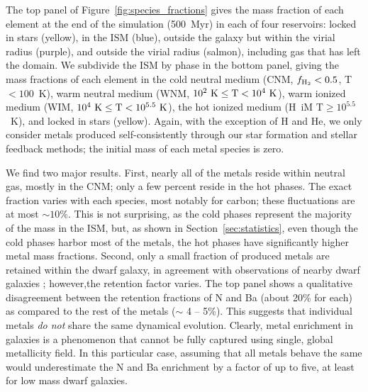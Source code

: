 \documentclass[twocolumn]{aastex61}
\begin{document}
The top panel of Figure~\ref{fig:species_fractions} gives the mass fraction of each element at the end of the simulation (500~Myr) in each of four reservoirs: locked in stars (yellow), in the ISM (blue), outside the galaxy but within the virial radius (purple), and outside the virial radius (salmon), including gas that has left the domain. We subdivide the ISM by phase in the bottom panel, giving the mass fractions of each element in the cold neutral medium (CNM, $f_{\rm H_2} < 0.5$,  T$< 100$~K), warm neutral medium (WNM, $10^2~\rm{K}\le \rm{T} < 10^4~\rm{K}$), warm ionized medium (WIM, $10^4~\rm{K}\le \rm{T} < 10^{5.5}~\rm{K}$), the hot ionized medium (H~{\sc i}M T$\ge 10^{5.5}$~K), and locked in stars (yellow). Again, with the exception of H and He, we only consider metals produced self-consistently through our star formation and stellar feedback methods; the initial mass of each metal species is zero.

We find two major results. First, nearly all of the metals reside within neutral gas, mostly in the CNM; only a few percent reside in the hot phases. The exact fraction varies with each species, most notably for carbon; these fluctuations are at most $\sim 10$\%. This is not surprising, as the cold phases represent the majority of the mass in the ISM, but, as shown in Section~\ref{sec:statistics}, even though the cold phases harbor most of the metals, the hot phases have significantly higher metal mass fractions. Second, only a small fraction of produced metals are retained within the dwarf galaxy, in agreement with observations of nearby dwarf galaxies \citep[see][]{Kirby2011-metals, McQuinn2015}; however,the retention factor varies. The top panel shows a qualitative disagreement between the retention fractions of N and Ba (about 20\% for each) as compared to the rest of the metals ($\sim$ 4 -- 5\%). This suggests that individual metals \textit{do not} share the same dynamical evolution. Clearly, metal enrichment in galaxies is a phenomenon that cannot be fully captured using single, global metallicity field. In this particular case, assuming that all metals behave the same would underestimate the N and Ba enrichment by a factor of up to five, at least for low mass dwarf galaxies.
\end{document}
